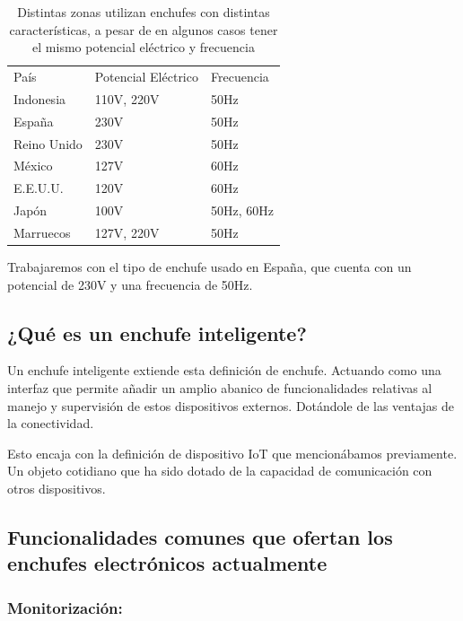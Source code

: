 \documentclass[a4paper,10pt]{article}
\begin{document}
\begin{table}[H]
  \centering
  \begin{tabular}{lll}
    \rowcolor[HTML]{DAE8FC} 
    País      & Potencial  Eléctrico & Frecuencia \\
    Indonesia & 110V, 220V           & 50Hz       \\
    \rowcolor[HTML]{F8FF00} 
    España    & 230V                 & 50Hz       \\
    Reino Unido & 230V               & 50Hz       \\
    México    & 127V                 & 60Hz       \\
    E.E.U.U.  & 120V                 & 60Hz       \\
    Japón     & 100V                 & 50Hz, 60Hz \\
    Marruecos & 127V, 220V           & 50Hz      
  \end{tabular}
  \caption{Distintas zonas utilizan enchufes con distintas
    características, a pesar de en algunos casos tener el mismo
    potencial eléctrico y frecuencia}\label{table:enchufes-paises}
\end{table}

Trabajaremos con el tipo de enchufe usado en España, que cuenta con un
potencial de 230V y una frecuencia de 50Hz\cite{IECWorldPlugs}.


\subsection{¿Qué es un enchufe
inteligente?}\label{que-es-un-enchufe-inteligente}

Un enchufe inteligente extiende esta definición de enchufe. Actuando
como una interfaz que permite añadir un amplio abanico de
funcionalidades relativas al manejo y supervisión de estos dispositivos
externos. Dotándole de las ventajas de la conectividad.

Esto encaja con la definición de dispositivo IoT que mencionábamos
previamente. Un objeto cotidiano que ha sido dotado de la capacidad de
comunicación con otros dispositivos.

\subsection{Funcionalidades comunes que ofertan los enchufes
electrónicos
actualmente}\label{funcionalidades-comunes-que-ofertan-los-enchufes-electruxf3nicos-actualmente}

\subsubsection{Monitorización:}\label{monitorizaciuxf3n}
\end{document}
